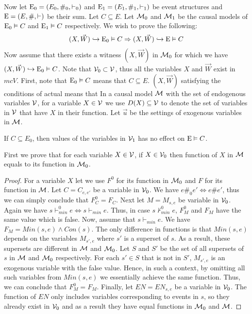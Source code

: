 \noindent Now let $\mathrm{E}_0 = (E_0,\#_0,\vdash_0)$ and
$\mathrm{E}_1 = (E_1,\#_1,\vdash_1)$ be event structures and
$\mathrm{E} = (E,\#,\vdash)$ be their sum.
Let $C \subseteq E$.
Let $\mathcal{M}_0$ and $\mathcal{M}_1$ be the causal models of
$\mathrm{E}_0 \vDash C$ and $\mathrm{E}_1 \vDash C$ respectively.
We wish to prove the following:
\begin{align*}
    (X,\vec W) \hookrightarrow \mathrm{E}_0 \vDash C
    \Rightarrow (X,\vec W) \hookrightarrow \mathrm{E} \vDash C
\end{align*}
Now assume that there exists a witness $(X,\vec W)$ in $\mathcal{M}_0$ for
which we have $(X,\vec W) \hookrightarrow \mathrm{E}_0 \vDash C$.
Note that $\mathcal{V}_0 \subset \mathcal{V}$, thus all the variables $X$ and
$\vec W$ exist in $mc{V}$.
First, note that $\mathrm{E}_0 \vDash C$ means that $C \subseteq E$.
$(X,\vec W)$ satisfying the conditions of actual means that
In a causal model $\mathcal{M}$ with the set of endogenous variables
$\mathcal{V}$, for a variable $X \in \mathcal{V}$ we use $D(X) \subseteq \mathcal{V}$
to denote the set of variables in $\mathcal{V}$ that have $X$ in their function.
Let $\vec u$ be the settings of exogenous variables in $\mathcal{M}$.
\begin{lemma}
    If $C \subseteq E_0$, then values of the variables in $\mathcal{V}_1$ has
    no effect on $\mathrm{E} \vDash C$.
\end{lemma}
\begin{lemma}
    First we prove that for each variable $X \in \mathcal{V}$, if $X \in \mathcal{V}_0$
    then function of $X$ in $\mathcal{M}$ equals to its function in $\mathcal{M}_0$.
\end{lemma}
\begin{proof}
    For a variable $X$ let we use $F^0$ for its function in
    $\mathcal{M}_0$ and $F$ for its function in $\mathcal{M}$.
    Let $C = C_{e,e'}$ be a variable in $\mathcal{V}_0$.
    We have $e\#_0e' \iff e\#e'$, thus we can simply
    conclude that $F^0_C = F_C$.
    Next let $M = M_{s,e}$ be variable in $\mathcal{V}_0$.
    Again we have $s \vdash_{min}^0 e \iff s \vdash_{min} e$.
    Thus, in case $s \not \vdash_{min}^0 e$, $F^0_M$ and
    $F_M$ have the same value which is false.
    Now, assume that $s \vdash_{min} e$.
    We have $F_M = Min(s,e) \wedge Con(s)$.
    The only difference in functions is that $Min(s,e)$
    depends on the variables $M_{s',e}$ where
    $s'$ is a superset of $s$.
    As a result, these supersets are different in $\mathcal{M}$ and $\mathcal{M}_0$.
    Let $S$ and $S'$ be the set of all supersets of $s$ in $\mathcal{M}$ and $\mathcal{M}_0$
    respectively.
    For each $s' \in S$ that is not in $S'$, $M_{s',e}$ is an exogenous
    variable with the false value.
    Hence, in such a context, by omitting all such variables from
    $Min(s,e)$ we essentially achieve the same function.
    Thus, we can conclude that $F_M^0 = F_M$.
    Finally, let $EN = EN_{s,e}$ be a variable in $\mathcal{V}_0$.
    The function of $EN$ only includes variables corresponding to events in
    $s$, so they already exist in $\mathcal{V}_0$ and as a result they have equal
    functions in $\mathcal{M}_0$ and $\mathcal{M}$.

\end{proof}

